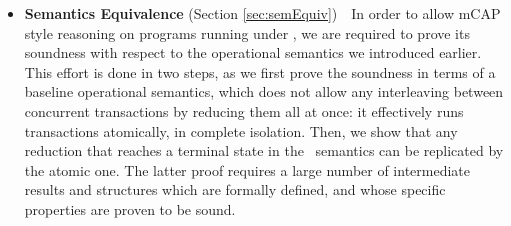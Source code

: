 \begin{itemize}
	\item \textbf{Semantics Equivalence} (Section \ref{sec:semEquiv})\ \ In order to allow mCAP style reasoning on programs running under \tpl, we are required to prove its soundness with respect to the operational semantics we introduced earlier. This effort is done in two steps, as we first prove the soundness in terms of a baseline operational semantics, which does not allow any interleaving between concurrent transactions by reducing them all at once: it effectively runs transactions atomically, in complete isolation. Then, we show that any reduction that reaches a terminal state in the \tpl\ semantics can be replicated by the atomic one. The latter proof requires a large number of intermediate results and structures which are formally defined, and whose specific properties are proven to be sound.
\end{itemize}
